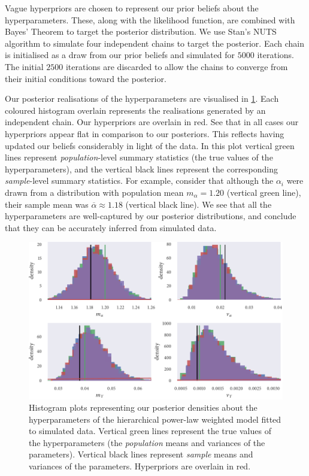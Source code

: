 Vague hyperpriors are chosen to represent our prior beliefs about the
hyperparameters. These, along with the likelihood function, are combined with
Bayes' Theorem to target the posterior distribution. We use Stan's NUTS
algorithm to simulate four independent chains to target the posterior. Each
chain is initialised as a draw from our prior beliefs and simulated for $5000$
iterations. The initial $2500$ iterations are discarded to allow the chains to
converge from their initial conditions toward the posterior.

Our posterior realisations of the hyperparameters are visualised in
\cref{fig:power_hier_hist}. Each coloured histogram overlain represents the
realisations generated by an independent chain. Our hyperpriors are overlain in
red. See that in all cases our hyperpriors appear flat in comparison to our
posteriors. This reflects having updated our beliefs considerably in light of
the data. In this plot vertical green lines represent \emph{population}-level
summary statistics (the true values of the hyperparameters), and the vertical
black lines represent the corresponding \emph{sample}-level summary statistics.
For example, consider that although the $\alpha_i$ were drawn from a
distribution with population mean $m_{\alpha}=1.20$ (vertical green line),
their sample mean was $\overline{\alpha}\approx1.18$ (vertical black line). We
see that all the hyperparameters are well-captured by our posterior
distributions, and conclude that they can be accurately inferred from simulated
data.

\begin{figure}[tbp]
  \includegraphics{power_hier_hist.pdf}
  \caption{Histogram plots representing our posterior densities about the
    hyperparameters of the hierarchical power-law weighted model fitted to
    simulated data. Vertical green lines represent the true values of the
    hyperparameters (the \emph{population} means and variances of the
    parameters). Vertical black lines represent \emph{sample} means and
    variances of the parameters. Hyperpriors are overlain in red.}
  \label{fig:power_hier_hist}
\end{figure}

